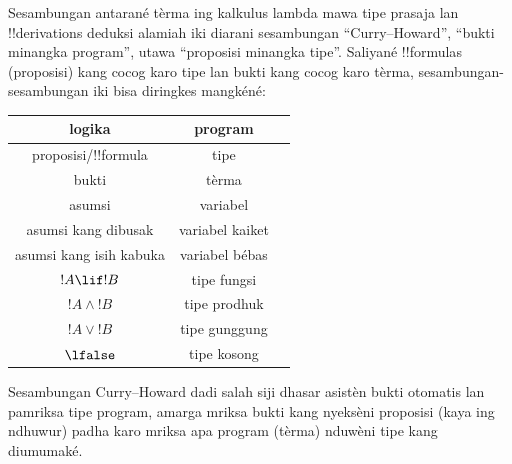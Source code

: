 \documentclass[../../../include/open-logic-section]{subfiles}
\begin{document}
Sesambungan antarané tèrma ing kalkulus lambda
mawa tipe prasaja lan !!{derivation}s deduksi
alamiah iki diarani sesambungan ``Curry--Howard'',
``bukti minangka program'', utawa ``proposisi
minangka tipe''. Saliyané !!{formula}s (proposisi)
kang cocog karo tipe lan bukti kang cocog karo
tèrma, sesambungan-sesambungan iki bisa diringkes
mangkéné:
\begin{center}
  \begin{tabular}{c c c}
    logika & program \\
    \hline
    proposisi/!!{formula} & tipe \\
    bukti & tèrma \\
    asumsi & variabel \\
    asumsi kang dibusak & variabel kaiket \\
    asumsi kang isih kabuka & variabel bébas \\
    $!A \lif !B$ & tipe fungsi \\
    $!A \land !B$ & tipe prodhuk \\
    $!A \lor !B$ & tipe gunggung \\
    $\lfalse$ & tipe kosong \\
    \hline
  \end{tabular}
\end{center}

Sesambungan Curry--Howard dadi salah siji dhasar
asistèn bukti otomatis lan pamriksa tipe program,
amarga mriksa bukti kang nyeksèni proposisi
(kaya ing ndhuwur) padha karo mriksa apa program
(tèrma) nduwèni tipe kang diumumaké.
\end{document}
